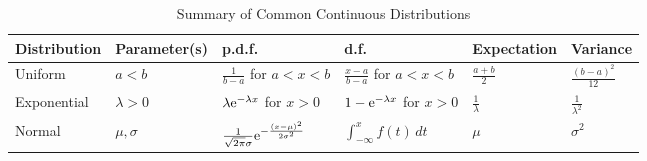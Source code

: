 \begin{table}[tbp]
  \centering
  \caption{Summary of Common Continuous Distributions}
  \scriptsize
  \begin{tabular}{l l l l l l}
    \toprule
    Distribution & Parameter(s) & p.d.f.\@ & d.f.\@ & Expectation & Variance \\
    \midrule
    Uniform & \(a < b\) & \(\frac{1}{b - a}\) for \(a < x < b\) & \(\frac{x - a}{b - a}\) for \(a < x < b\) & \(\frac{a + b}{2}\) & \(\frac{(b - a)^2}{12}\) \\
    Exponential & \(\lambda > 0\) & \(\lambda \mathrm{e}^{-\lambda x}\) for \(x > 0\) & \(1 - \mathrm{e}^{-\lambda x}\) for \(x > 0\) & \(\frac{1}{\lambda}\) & \(\frac{1}{\lambda^2}\) \\
    Normal & \(\mu, \sigma\) & \(\frac{1}{\sqrt{2\mathrm{\pi}} \sigma} \mathrm{e}^{-\frac{(x - \mu)^2}{2\sigma^2}}\) & \(\int_{-\infty}^x f(t)\,dt\) & \(\mu\) & \(\sigma^2\) \\
    \bottomrule
  \end{tabular}
\end{table}
